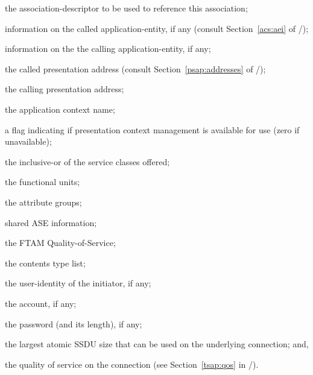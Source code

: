 \begin{describe}
\item[\verb"fts\_sd":] the association-descriptor to be used to reference
this association;

\item[\verb"fts\_calledtitle":] information on the called application-entity,
if any (consult Section~\ref{acs:aei} of \volone/);

\item[\verb"fts\_callingtitle":] information on the the calling
application-entity, if any;

\item[\verb"fts\_calledaddr":] the called presentation address
(consult Section~\ref{psap:addresses} of \voltwo/);

\item[\verb"fts\_callingaddr":] the calling presentation address;

\item[\verb"fts\_context":] the application context name;

\item[\verb"fts\_manage":] a flag indicating if presentation context
management is available for use (zero if unavailable);

\item[\verb"fts\_class":] the inclusive-or of the service classes offered;

\item[\verb"fts\_units":] the functional units;

\item[\verb"fts\_attrs":] the attribute groups;

\item[\verb"fts\_sharedASE":] shared ASE information;

\item[\verb"fts\_fqos":] the FTAM Quality-of-Service;

\item[\verb"fts\_contents":] the contents type list;

\item[\verb"fts\_initiator":] the user-identity of the initiator, if any;

\item[\verb"fts\_account":] the account, if any;

\item[\verb"fts\_password"/\verb"fts\_passlen":] the password (and its
length), if any;

\item[\verb"fts\_ssdusize":] the largest atomic SSDU size that can be used
on the underlying connection;
and,

\item[\verb"qos":] the quality of service on the connection
(see Section~\ref{tsap:qos} in \voltwo/).
\end{describe}
